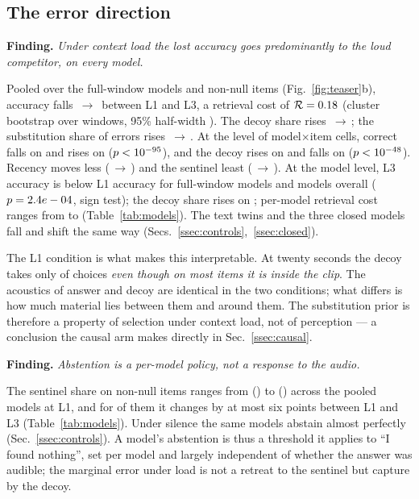 \documentclass{article}
\newcommand{\finding}[1]{\par\smallskip\noindent\textbf{Finding.} \emph{#1}\par\smallskip}
\begin{document}
\subsection{The error direction}
\label{ssec:overall}
\finding{Under context load the lost accuracy goes predominantly to the loud
competitor, on every model.}
Pooled over the \Nfullcov{} full-window models and non-null items
(Fig.~\ref{fig:teaser}b), accuracy falls
\roleCorrectLOne{}\,$\rightarrow$\,\roleCorrectLThree{} between L1 and L3, a
retrieval cost of $\mathcal{R}=0.18{}$ (cluster bootstrap over
windows, 95\% half-width \ciRetrievalCost{}). The decoy share rises
\roleSalienceLOne{}\,$\rightarrow$\,\roleSalienceLThree{}; the substitution share
of errors rises \Siso{}\,$\rightarrow$\,\Sfull{}. At the level of
model$\times$item cells, correct falls on \pairCorrectDown{} and rises on
\pairCorrectUp{} ($p<10^{-95}{}$), and the decoy rises on
\pairSalienceUp{} and falls on \pairSalienceDown{} ($p<10^{-48}{}$).
Recency moves less (\roleRecencyLOne{}\,$\rightarrow$\,\roleRecencyLThree{})
and the sentinel least (\roleAbsentLOne{}\,$\rightarrow$\,\roleAbsentLThree{}).
At the model level, L3 accuracy is below L1 accuracy for \signLThreebelowLOne{}
full-window models and \signLThreebelowLOneall{} models overall ($p=2.4e-04{}$,
sign test); the decoy share rises on \signDecoyUp{}; per-model retrieval
cost ranges from \minRetrievalCost{} to \maxRetrievalCost{}
(Table~\ref{tab:models}). The \Ntwins{} text twins and the three closed
models fall and shift the same way (Secs.~\ref{ssec:controls},~\ref{ssec:closed}).

The L1 condition is what makes this interpretable. At twenty seconds the
decoy takes only \roleSalienceLOne{} of choices \emph{even though on most items
it is inside the clip}. The acoustics of answer and decoy are identical in
the two conditions; what differs is how much material lies between them and
around them. The substitution prior is therefore a property of selection
under context load, not of perception --- a conclusion the causal arm makes
directly in Sec.~\ref{ssec:causal}.

\finding{Abstention is a per-model policy, not a response to the audio.}
The sentinel share on non-null items ranges from \absRangeLo{}
(\absLightest{}) to \absRangeHi{} (\absHeaviest{}) across the pooled models
at L1, and for \absPolicyStable{} of them it changes by at most six points
between L1 and L3 (Table~\ref{tab:models}). Under silence the same models
abstain almost perfectly (Sec.~\ref{ssec:controls}). A model's abstention is
thus a threshold it applies to ``I found nothing'', set per model and
largely independent of whether the answer was audible; the marginal error
under load is not a retreat to the sentinel but capture by the decoy.
\end{document}
